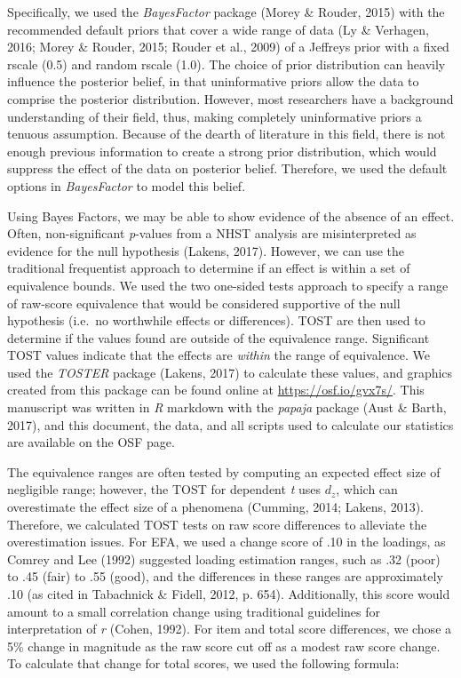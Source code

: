 \documentclass[english,man, mask]{apa6}
\theoremstyle{definition}
\theoremstyle{definition}
\theoremstyle{definition}
\theoremstyle{remark}
\begin{document}
Specifically, we used the \emph{BayesFactor} package (Morey \& Rouder,
2015) with the recommended default priors that cover a wide range of
data (Ly \& Verhagen, 2016; Morey \& Rouder, 2015; Rouder et al., 2009)
of a Jeffreys prior with a fixed rscale (0.5) and random rscale (1.0).
The choice of prior distribution can heavily influence the posterior
belief, in that uninformative priors allow the data to comprise the
posterior distribution. However, most researchers have a background
understanding of their field, thus, making completely uninformative
priors a tenuous assumption. Because of the dearth of literature in this
field, there is not enough previous information to create a strong prior
distribution, which would suppress the effect of the data on posterior
belief. Therefore, we used the default options in \emph{BayesFactor} to
model this belief.

Using Bayes Factors, we may be able to show evidence of the absence of
an effect. Often, non-significant \emph{p}-values from a NHST analysis
are misinterpreted as evidence for the null hypothesis (Lakens, 2017).
However, we can use the traditional frequentist approach to determine if
an effect is within a set of equivalence bounds. We used the two
one-sided tests approach to specify a range of raw-score equivalence
that would be considered supportive of the null hypothesis (i.e.~no
worthwhile effects or differences). TOST are then used to determine if
the values found are outside of the equivalence range. Significant TOST
values indicate that the effects are \emph{within} the range of
equivalence. We used the \emph{TOSTER} package (Lakens, 2017) to
calculate these values, and graphics created from this package can be
found online at \url{https://osf.io/gvx7s/}. This manuscript was written
in \emph{R} markdown with the \emph{papaja} package (Aust \& Barth,
2017), and this document, the data, and all scripts used to calculate
our statistics are available on the OSF page.

The equivalence ranges are often tested by computing an expected effect
size of negligible range; however, the TOST for dependent \emph{t} uses
\(d_z\), which can overestimate the effect size of a phenomena (Cumming,
2014; Lakens, 2013). Therefore, we calculated TOST tests on raw score
differences to alleviate the overestimation issues. For EFA, we used a
change score of .10 in the loadings, as Comrey and Lee (1992) suggested
loading estimation ranges, such as .32 (poor) to .45 (fair) to .55
(good), and the differences in these ranges are approximately .10 (as
cited in Tabachnick \& Fidell, 2012, p. 654). Additionally, this score
would amount to a small correlation change using traditional guidelines
for interpretation of \emph{r} (Cohen, 1992). For item and total score
differences, we chose a 5\% change in magnitude as the raw score cut off
as a modest raw score change. To calculate that change for total scores,
we used the following formula:
\end{document}
